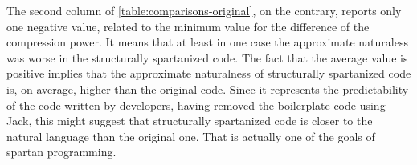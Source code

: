 The second column of \cref{table:comparisons-original}, on the contrary, reports only 
one negative value, related to the minimum value for the difference of the compression power. 
It means that at least in one case the approximate naturaless was worse in the 
structurally spartanized code. The fact that the average value is positive implies
that the approximate naturalness of structurally spartanized
code is, on average, higher than the original code. Since it represents the predictability of
the code written by developers, having removed the boilerplate code using Jack, this
might suggest that structurally spartanized code is closer to the natural language
than the original one. That is actually one of the goals of spartan programming. 


